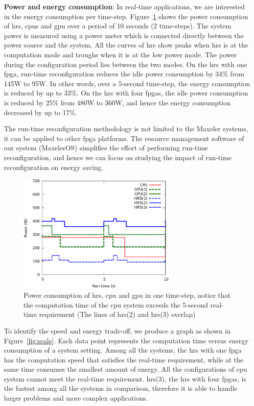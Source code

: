 \textbf{Power and energy consumption}: In real-time applications, we are interested in the energy consumption per time-step.
Figure~\ref{fig:power} shows the power consumption of \gls{hrs}, \gls{cpu}s and \gls{gpu} over a period of 10 seconds (2 time-steps).
The system power is measured using a power meter which is connected directly between the power source and the system.
All the curves of \gls{hrs} show peaks when \gls{hrs} is at the computation mode and troughs when it is at the low power mode.
The power during the configuration period lies between the two modes.
On the \gls{hrs} with one \gls{fpga}, run-time reconfiguration reduces the idle power consumption by 34\% from 145W to 95W.
In other words, over a 5-second time-step, the energy consumption is reduced by up to 33\%.
On the \gls{hrs} with four \gls{fpga}s, the idle power consumption is reduced by 25\% from 480W to 360W, and hence the energy consumption decreased by up to 17\%.

The run-time reconfiguration methodology is not limited to the Maxeler systems, it can be applied to other \gls{fpga} platforms.
The resource management software of our system (MaxelerOS) simplifies the effort of performing run-time reconfiguration, and hence we can focus on studying the impact of run-time reconfiguration on energy saving.

\begin{figure}[t!]
\centering
\includegraphics[width=0.7\textwidth]{runtime_reconfiguration/figures/fig_power2}
\caption{Power consumption of \gls{hrs}, \gls{cpu} and \gls{gpu} in one time-step, notice that the computation time of the \gls{cpu} system exceeds the 5-second real-time requirement (The lines of \gls{hrs}(2) and \gls{hrs}(3) overlap)}
\label{fig:power}
\end{figure}

To identify the speed and energy trade-off, we produce a graph as shown in Figure~\ref{fig:scale}. 
Each data point represents the computation time versus energy consumption of a system setting.
Among all the systems, the \gls{hrs} with one \gls{fpga} has the computation speed that satisfies the real-time requirement, while at the same time consumes the smallest amount of energy.
All the configurations of \gls{cpu} system cannot meet the real-time requirement.
\gls{hrs}(3), the \gls{hrs} with four \gls{fpga}s, is the fastest among all the systems in comparison, therefore it is able to handle larger problems and more complex applications.

